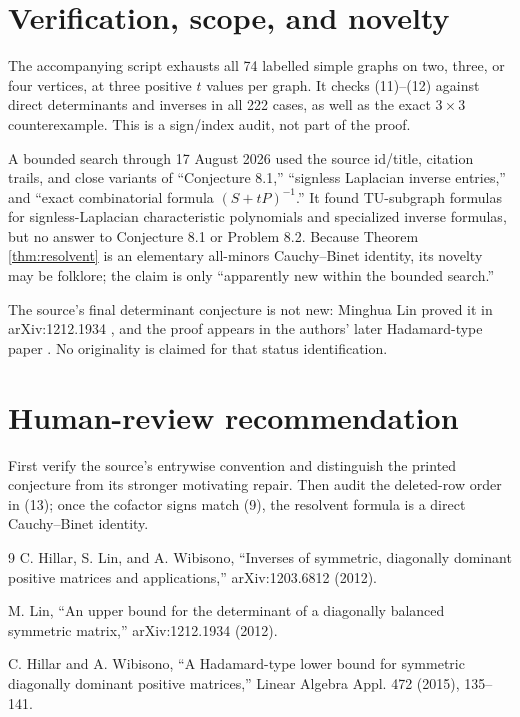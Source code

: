 \documentclass[10pt]{article}
\begin{document}
\section*{Verification, scope, and novelty}

The accompanying script exhausts all 74 labelled simple graphs on two,
three, or four vertices, at three positive $t$ values per graph.  It checks
(11)--(12) against direct determinants and inverses in all 222 cases, as well
as the exact $3\times3$ counterexample.  This is a sign/index audit, not part
of the proof.

A bounded search through 17 August 2026 used the source id/title, citation
trails, and close variants of ``Conjecture 8.1,'' ``signless Laplacian inverse
entries,'' and ``exact combinatorial formula $(S+tP)^{-1}$.''  It found
TU-subgraph formulas for signless-Laplacian characteristic polynomials and
specialized inverse formulas, but no answer to Conjecture 8.1 or Problem 8.2.
Because Theorem \ref{thm:resolvent} is an elementary all-minors
Cauchy--Binet identity, its novelty may be folklore; the claim is only
``apparently new within the bounded search.''

The source's final determinant conjecture is not new: Minghua Lin proved it
in arXiv:1212.1934 \cite{Lin}, and the proof appears in the authors' later
Hadamard-type paper \cite{HW}.  No originality is claimed for that status
identification.

\section*{Human-review recommendation}

First verify the source's entrywise convention and distinguish the printed
conjecture from its stronger motivating repair.  Then audit the deleted-row
order in (13); once the cofactor signs match (9), the resolvent formula is a
direct Cauchy--Binet identity.

\begin{thebibliography}{9}
C. Hillar, S. Lin, and A. Wibisono,
``Inverses of symmetric, diagonally dominant positive matrices and
applications,'' arXiv:1203.6812 (2012).

M. Lin, ``An upper bound for the determinant of a diagonally balanced
symmetric matrix,'' arXiv:1212.1934 (2012).

C. Hillar and A. Wibisono, ``A Hadamard-type lower bound for symmetric
diagonally dominant positive matrices,'' Linear Algebra Appl. 472 (2015),
135--141.
\end{thebibliography}
\end{document}

